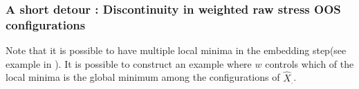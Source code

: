 \documentclass[11pt]{article} %
\begin{document}

\subsubsection{ A short detour : Discontinuity in weighted raw stress OOS configurations\label{subsubsec:Discontinuity}}

Note that it is possible to have multiple local minima in the embedding step(see example in \cite{TrossetLocalMin}). It is possible to construct an example  where $w$ controls which of the local minima is the global minimum among the configurations of $\hat{X}_{.}$.
 
\end{document}
